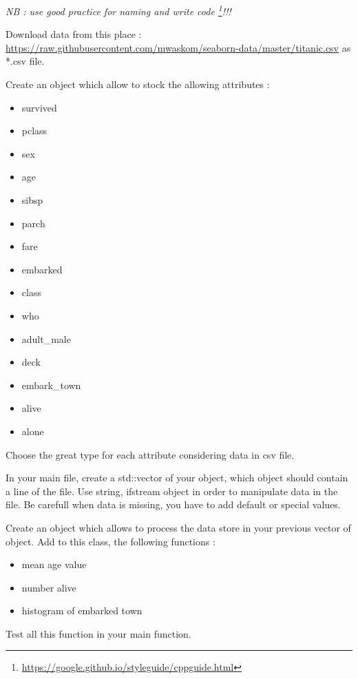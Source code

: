 \documentclass[12pt]{tdtp}
\begin{document}
\titre
\textit{NB : use good practice for naming and write code \footnote{\url{https://google.github.io/styleguide/cppguide.html}}!!!}

\Exo

Download data from this place : \url{https://raw.githubusercontent.com/mwaskom/seaborn-data/master/titanic.csv}
as *.csv file.

Create an object which allow to stock the allowing attributes :
\begin{itemize}
	\item survived
	\item pclass
	\item sex
	\item age
	\item sibsp
	\item parch
	\item fare
	\item embarked
	\item class
	\item who
	\item adult\_male
	\item deck
	\item embark\_town
	\item alive
	\item alone
\end{itemize}

Choose the great type for each attribute considering data in csv file.

In your main file, create a std::vector of your object, which object should contain a line of the file.
Use string, ifstream object in order to manipulate data in the file.
Be carefull when data is missing, you have to add default or special values.


\Exo

Create an object which allows to process the data store in your previous vector of object.
Add to this class, the following functions :

\begin{itemize}
	\item mean age value
	\item number alive
	\item histogram of embarked town
\end{itemize}

Test all this function in your main function.
\end{document}
